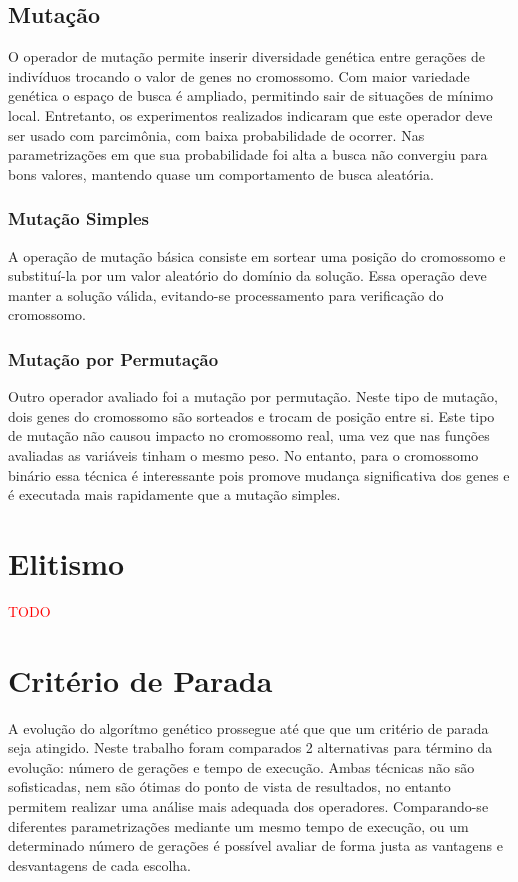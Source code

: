 \documentclass[conference]{IEEEtran}
\newcommand\myworries[1]{\textcolor{red}{#1}}
\begin{document}
\subsection{Mutação}
O operador de mutação permite inserir diversidade genética entre gerações de
indivíduos trocando o valor de genes no cromossomo. Com maior variedade genética
o espaço de busca é ampliado, permitindo sair de situações de mínimo local.
Entretanto, os experimentos realizados indicaram que este operador deve ser
usado com parcimônia, com baixa probabilidade de ocorrer. Nas parametrizações em
que sua probabilidade foi alta a busca não convergiu para bons valores, mantendo
quase um comportamento de busca aleatória.

\subsubsection{Mutação Simples}
A operação de mutação básica consiste em sortear uma posição do cromossomo e
substituí-la por um valor aleatório do domínio da solução. Essa operação deve
manter a solução válida, evitando-se processamento para verificação do
cromossomo.

\subsubsection{Mutação por Permutação}
Outro operador avaliado foi a mutação por permutação. Neste tipo de mutação,
dois genes do cromossomo são sorteados e trocam de posição entre si. Este tipo
de mutação não causou impacto no cromossomo real, uma vez que nas funções
avaliadas as variáveis tinham o mesmo peso. No entanto, para o cromossomo
binário essa técnica é interessante pois promove mudança significativa dos
genes e é executada mais rapidamente que a mutação simples.

\section{Elitismo}
\myworries{TODO}

\section{Critério de Parada}
A evolução do algorítmo genético prossegue até que que um critério de parada
seja atingido. Neste trabalho foram comparados 2 alternativas para término da
evolução: número de gerações e tempo de execução. Ambas técnicas não são
sofisticadas, nem são ótimas do ponto de vista de resultados, no entanto
permitem realizar uma análise mais adequada dos operadores. Comparando-se
diferentes parametrizações mediante um mesmo tempo de execução, ou um
determinado número de gerações é possível avaliar de forma justa as vantagens e
desvantagens de cada escolha.
\end{document}
